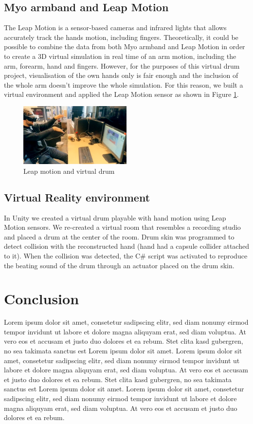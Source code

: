 \documentclass{vgtc}
\begin{document}
\subsection{Myo armband and Leap Motion}
The Leap Motion is a sensor-based cameras and infrared lights that allows accurately track the hands motion, including ﬁngers. Theoretically, it could be possible to combine the data from both Myo armband and Leap Motion in order to create a 3D virtual simulation in real time of an arm motion, including the arm, forearm, hand and fingers. However, for the purposes of this virtual drum project, visualisation of the own hands only is fair enough and the inclusion of the whole arm doesn't improve the whole simulation. For this reason, we built a virtual environment and applied the Leap Motion sensor as shown in Figure \ref{fig:sl1}.
\begin{figure}[h]
\includegraphics[width=0.5\textwidth]{sil_drum}
\caption{Leap motion and virtual drum}
\centering
\label{fig:sl1}
\end{figure}
\subsection{Virtual Reality environment}
In Unity we created a virtual drum playable with hand motion using Leap Motion sensors. We re-created a virtual room that resembles a recording studio and placed a drum at the center of the room. Drum skin was programmed to detect collision with the reconstructed hand (hand had a capsule collider attached to it). When the collision was detected, the C\# script was activated to reproduce the beating sound of the drum through an actuator placed on the drum skin.
\section{Conclusion}

Lorem ipsum dolor sit amet, consetetur sadipscing elitr, sed diam
nonumy eirmod tempor invidunt ut labore et dolore magna aliquyam erat,
sed diam voluptua. At vero eos et accusam et justo duo dolores et ea
rebum. Stet clita kasd gubergren, no sea takimata sanctus est Lorem
ipsum dolor sit amet. Lorem ipsum dolor sit amet, consetetur
sadipscing elitr, sed diam nonumy eirmod tempor invidunt ut labore et
dolore magna aliquyam erat, sed diam voluptua. At vero eos et accusam
et justo duo dolores et ea rebum. Stet clita kasd gubergren, no sea
takimata sanctus est Lorem ipsum dolor sit amet. Lorem ipsum dolor sit
amet, consetetur sadipscing elitr, sed diam nonumy eirmod tempor
invidunt ut labore et dolore magna aliquyam erat, sed diam
voluptua. At vero eos et accusam et justo duo dolores et ea
rebum.
\end{document}

